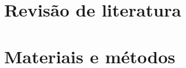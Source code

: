 \documentclass[
	12pt,				%
	openright,			%
	twoside,			%
	a4paper,			%
	english,			%
	brazil				%
	]{abntex2}
\begin{document}


\part{Revisão de literatura}






\part{Materiais e métodos}











\postextual



% 







\printindex
\end{document}
